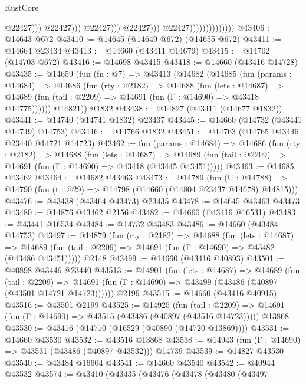 \begin{lexlean}{RustCore}
\begin{coremodule}
                                                        @22427)))
                                                  @22427)))
                                            @22427)))
                                      @22427)))
                                @22427))))))))))))))
@43406 := @14643 @672
@43410 := @14645 (@14649 @672) (@14655 @672)
@43411 := @14664 @23434
@43413 := @14660 (@43411 @14679)
@43415 := @14702 (@14703 @672)
@43416 := @14698 @43415
@43418 := @14660 (@43416 @14728)
@43435 := @14659
    (fun (fn : @7) =>
    @43413
      (@14682
        (@14685
          (fun (params : @14684) =>
          @14686
            (fun (rty : @2182) =>
            @14688
              (fun (lets : @14687) =>
              @14689 (fun (tail : @2209) => @14691 (fun (Γ : @14690) => @43418 @14775))))))
        @14821))
    @1832
@43438 := @14827 (@43411 (@14677 @1832))
@43441 := @14740 (@14741 @1832) @23437
@43445 := @14660 (@14732 (@43441 @14749) @14753)
@43446 := @14766 @1832
@43451 := @14763 (@14765 @43446 @23440 @14721 @14723)
@43462 := fun (params : @14684) =>
  @14686
    (fun (rty : @2182) =>
    @14688
      (fun (lets : @14687) =>
      @14689 (fun (tail : @2209) => @14691 (fun (Γ : @14690) => @43418 (@43445 @43451)))))
@43463 := @14685 @43462
@43464 := @14682 @43463
@43473 := @14789
    (fun (U : @14788) => @14790 (fun (t : @29) => @14798 (@14660 (@14804 @23437 @14678) @14815)))
@43476 := @43438 (@43464 @43473) @23435
@43478 := @14645 @43463 @43473
@43480 := @14876 @43462 @2156
@43482 := @14660 (@43416 @16531)
@43483 := @43441 @16534
@43484 := @14732 @43483
@43486 := @14660 (@43484 @14753)
@43497 := @14879
    (fun (rty : @2182) =>
    @14688
      (fun (lets : @14687) =>
      @14689 (fun (tail : @2209) => @14691 (fun (Γ : @14690) => @43482 (@43486 @43451)))))
    @2148
@43499 := @14660 (@43416 @40893)
@43501 := @40898 @43446 @23440
@43513 := @14901
    (fun (lets : @14687) =>
    @14689
      (fun (tail : @2209) =>
      @14691 (fun (Γ : @14690) => @43499 (@43486 (@40897 (@43501 @14721 @14723))))))
    @2199
@43515 := @14660 (@43416 @40915)
@43516 := @43501 @2199
@43525 := @14925
    (fun (tail : @2209) => @14691 (fun (Γ : @14690) => @43515 (@43486 (@40897 (@43516 @14723)))))
    @13868
@43530 := @43416 (@14710 (@16529 (@40890 (@14720 @13869))))
@43531 := @14660 @43530
@43532 := @43516 @13868
@43538 := @14943 (fun (Γ : @14690) => @43531 (@43486 (@40897 @43532))) @14739
@43539 := @14827 @43530
@43540 := @43484 @16604
@43541 := @14660 @43540
@43542 := @40944 @43532
@43574 := @43410
    (@43435
      (@43476
        (@43478
          (@43480
            (@43497

\end{coremodule}
\end{lexlean}
